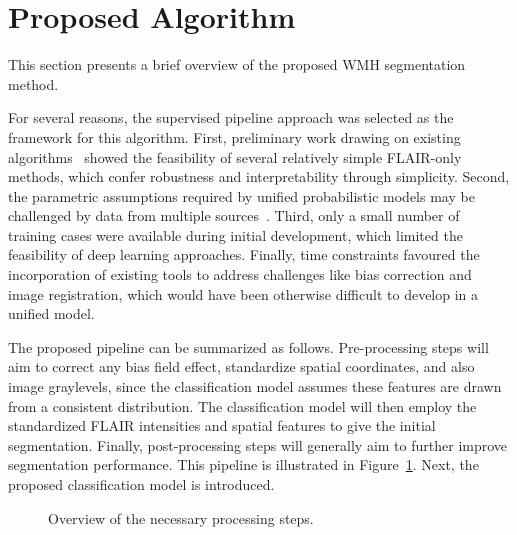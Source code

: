 \section{Proposed Algorithm}\label{s:intro-proposed}
This section presents a brief overview of the proposed WMH segmentation method.
\par
For several reasons, the supervised pipeline approach
was selected as the framework for this algorithm.
First, preliminary work drawing on existing algorithms~\cite{Khademi2014,Schmidt2015}
showed the feasibility of several relatively simple FLAIR-only methods,
which confer robustness and interpretability through simplicity.
Second, the parametric assumptions required by unified probabilistic models
may be challenged by data from multiple sources~\cite{VanLeemput2001}.
Third, only a small number of training cases were available during initial development,
which limited the feasibility of deep learning approaches.
Finally, time constraints favoured the incorporation of existing tools
to address challenges like bias correction and image registration,
which would have been otherwise difficult to develop in a unified model.
\par
The proposed pipeline can be summarized as follows.
Pre-processing steps will aim to
correct any bias field effect, standardize spatial coordinates, and also image graylevels,
since the classification model assumes these features are drawn from a consistent distribution.
The classification model will then employ
the standardized FLAIR intensities and spatial features to give the initial segmentation.
Finally, post-processing steps will generally aim to further improve segmentation performance.
This pipeline is illustrated in Figure~\ref{fig:pipeline}.
Next, the proposed classification model is introduced.
\begin{figure}
  \centering\scalebox{0.65}{}
  \caption{Overview of the necessary processing steps.}%
  \label{fig:pipeline}
\end{figure}
